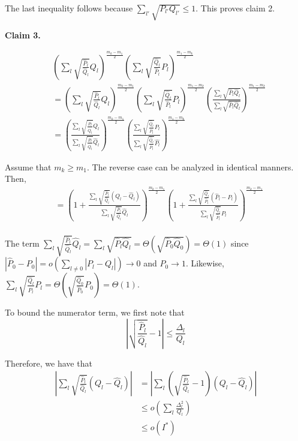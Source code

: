 \documentclass{article}
\begin{document}
The last inequality follows because $\sum_{l'} \sqrt{P_{l'} Q_{l'}} \leq 1$. This proves claim 2.

\textbf{Claim 3.} 

\begin{align*}
& \left( \sum_l \sqrt{\frac{\hat{P}_l}{\hat{Q}_l}} Q_l \right)^{\frac{m_k - m_1}{2}} 
 \left( \sum_l \sqrt{\frac{\hat{Q}_l}{\hat{P}_l}} P_l \right)^{\frac{m_1 - m_k}{2}} \\
&= \left( \sum_l \sqrt{\frac{\hat{P}_l}{\hat{Q}_l}} Q_l \right)^{\frac{m_k - m_1}{2}} 
 \left( \sum_l \sqrt{\frac{\hat{Q}_l}{\hat{P}_l}} P_l \right)^{\frac{m_1 - m_k}{2}} 
   \left( \frac{\sum_l \sqrt{\hat{P}_l \hat{Q}_l}}{\sum_l \sqrt{\hat{P}_l \hat{Q}_l}} \right)^{\frac{m_1 - m_k}{2}} \\
&=  \left( 
   \frac{\sum_l \sqrt{\frac{\hat{P}_l}{\hat{Q}_l}} Q_l}
        {\sum_l \sqrt{\frac{\hat{P}_l}{\hat{Q}_l}} \hat{Q}_l} 
     \right)^{\frac{m_k - m_1}{2}} 
   \left( \frac{\sum_l \sqrt{\frac{\hat{Q}_l}{\hat{P}_l}} P_l}
         {\sum_l \sqrt{\frac{\hat{Q}_l}{\hat{P}_l}} \hat{P_l} } \right)^{\frac{m_1 - m_k}{2}} 
\end{align*}

Assume that $m_k \geq m_1$. The reverse case can be analyzed in identical manners. Then,
\begin{align*}
&= \left( 1 + 
   \frac{\sum_l \sqrt{\frac{\hat{P}_l}{\hat{Q}_l}} (Q_l - \hat{Q}_l)}
        {\sum_l \sqrt{\frac{\hat{P}_l}{\hat{Q}_l}} \hat{Q}_l} 
     \right)^{\frac{m_k - m_1}{2}} 
   \left( 1+ \frac{\sum_l \sqrt{\frac{\hat{Q}_l}{\hat{P}_l}} (\hat{P}_l - P_l)}
         {\sum_l \sqrt{\frac{\hat{Q}_l}{\hat{P}_l}} P_l } \right)^{\frac{m_k - m_1}{2}} 
   \\
\end{align*}

The term $\sum_l \sqrt{\frac{\hat{P}_l}{\hat{Q}_l}} \hat{Q}_l = \sum_l \sqrt{\hat{P}_l \hat{Q}_l} = \Theta( \sqrt{\hat{P}_0 \hat{Q}_0} ) =  \Theta(1)$ since $|\hat{P}_0 - P_0| = o( \sum_{l\neq 0} |P_l - Q_l|) \rightarrow 0$ and $P_0 \rightarrow 1$. Likewise, 
$\sum_l \sqrt{ \frac{\hat{Q}_l}{\hat{P}_l}} P_l 
  = \Theta \left( \sqrt{ \frac{\hat{Q}_0}{\hat{P}_0}} P_0 \right) =
  \Theta(1)$. 

To bound the numerator term, we first note that 
\[
\left| \sqrt{ \frac{\hat{P}_l}{\hat{Q}_l} } - 1 \right| \leq \frac{\Delta_l}{Q_l}
\]

Therefore, we have that
\begin{align*}
\left| \sum_l \sqrt{\frac{\hat{P}_l}{\hat{Q}_l}} (Q_l - \hat{Q}_l) \right|  &= 
  \left|  \sum_l \left( \sqrt{\frac{\hat{P}_l}{\hat{Q}_l}} -1 \right) (Q_l - \hat{Q}_l) 
 \right| \\
 &\leq o\left( \sum_l \frac{\Delta^2_l}{Q_l} \right) \\
& \leq o( I^*) 
\end{align*}
\end{document}
